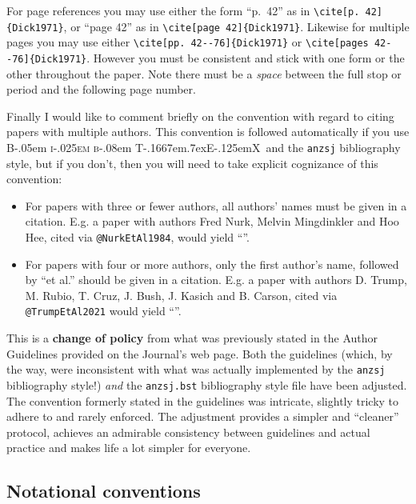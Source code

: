\documentclass[
  times,
  doublespace]{anzsauth}
\providecommand{\tightlist}{%
  \setlength{\itemsep}{0pt}\setlength{\parskip}{0pt}}\usepackage{longtable,booktabs,array}
\newcommand\BibTeX{{\rmfamily B\kern-.05em \textsc{i\kern-.025em b}\kern-.08em
T\kern-.1667em\lower.7ex\hbox{E}\kern-.125emX}}
\begin{document}
For page references you may use either the form ``p.~42'' as in
\texttt{\textbackslash{}cite{[}p.\ 42{]}\{Dick1971\}}, or ``page 42'' as
in \texttt{\textbackslash{}cite{[}page\ 42{]}\{Dick1971\}}. Likewise for
multiple pages you may use either
\texttt{\textbackslash{}cite{[}pp.\ 42-\/-76{]}\{Dick1971\}} or
\texttt{\textbackslash{}cite{[}pages\ 42-\/-76{]}\{Dick1971\}}. However
you must be consistent and stick with one form or the other throughout
the paper. Note there must be a \emph{space} between the full stop or
period and the following page number.

Finally I would like to comment briefly on the convention with regard to
citing papers with multiple authors. This convention is followed
automatically if you use \BibTeX~and the \texttt{anzsj} bibliography
style, but if you don't, then you will need to take explicit cognizance
of this convention:

\begin{itemize}
\tightlist
\item
  For papers with three or fewer authors, all authors' names must be
  given in a citation. E.g. a paper with authors Fred Nurk, Melvin
  Mingdinkler and Hoo Hee, cited via \texttt{@NurkEtAl1984}, would yield
  ``\citet{NurkEtAl1984}''.
\item
  For papers with four or more authors, only the first author's name,
  followed by ``et al.'' should be given in a citation. E.g. a paper
  with authors D. Trump, M. Rubio, T. Cruz, J. Bush, J. Kasich and B.
  Carson, cited via \texttt{@TrumpEtAl2021} would yield
  ``\citet{TrumpEtAl2021}''.
\end{itemize}

This is a \textbf{change of policy} from what was previously stated in
the Author Guidelines provided on the Journal's web page. Both the
guidelines (which, by the way, were inconsistent with what was actually
implemented by the \texttt{anzsj} bibliography style!) \emph{and} the
\texttt{anzsj.bst} bibliography style file have been adjusted. The
convention formerly stated in the guidelines was intricate, slightly
tricky to adhere to and rarely enforced. The adjustment provides a
simpler and ``cleaner'' protocol, achieves an admirable consistency
between guidelines and actual practice and makes life a lot simpler for
everyone.

\subsection{Notational conventions}\label{sec-noteConv}
\end{document}
